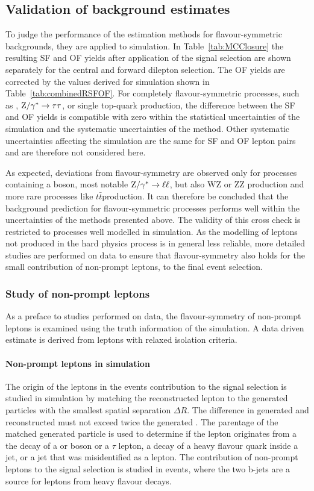 \subsection{Validation of background estimates}
\label{sec:validation}
To judge the performance of the estimation methods for flavour-symmetric backgrounds, they are applied to simulation. In Table~\ref{tab:MCClosure} the resulting SF and OF yields after application of the signal selection are shown separately for the central and forward dilepton selection. The OF yields are corrected by the \Rsfof values derived for simulation shown in Table~\ref{tab:combinedRSFOF}. For completely flavour-symmetric processes, such as \ttbar, $\mathrm{Z}/\gamma^{*}\rightarrow \tau\tau$, or single top-quark production, the difference between the SF and OF yields is compatible with zero within the statistical uncertainties of the simulation and the systematic uncertainties of the method. Other systematic uncertainties affecting the simulation are the same for SF and OF lepton pairs and are therefore not considered here. 

 As expected, deviations from flavour-symmetry are observed only for processes containing a \Z boson, most notable $\mathrm{Z}/\gamma^{*}\rightarrow \ell\ell$, but also $\mathrm{WZ}$ or $\mathrm{ZZ}$ production and more rare processes like $t\bar{t}$\Z production. It can therefore be concluded that the background prediction for flavour-symmetric processes performs well within the uncertainties of the methods presented above. The validity of this cross check is restricted to processes well modelled in simulation. As the modelling of leptons not produced in the hard physics process is in general less reliable, more detailed studies are performed on data to ensure that flavour-symmetry also holds for the small contribution of non-prompt leptons, to the final event selection.
\subsubsection*{Study of non-prompt leptons}
As a preface to studies performed on data, the flavour-symmetry of non-prompt leptons is examined using the truth information of the simulation. A data driven estimate is derived from leptons with relaxed isolation criteria.
\paragraph*{Non-prompt leptons in simulation}
The origin of the leptons in the events contribution to the signal selection is studied in simulation by matching the reconstructed lepton to the generated particles with the smallest spatial separation $\Delta R$. The difference in generated and reconstructed \pt must not exceed twice the generated \pt. The parentage of the matched generated particle is used to determine if the lepton originates from a the decay of a \Z or \W boson or a $\tau$ lepton, a decay of a heavy flavour quark inside a jet, or a jet that was misidentified as a lepton. The contribution of non-prompt leptons to the signal selection is studied in \ttbar events, where the two b-jets are a source for leptons from heavy flavour decays. 

